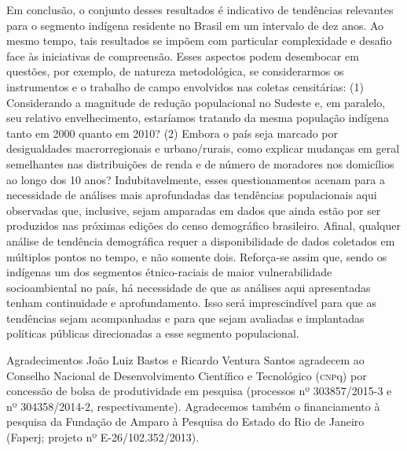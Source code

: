 \documentclass{article}
\begin{document}
Em conclusão, o conjunto desses resultados é indicativo de tendências relevantes
para o segmento indígena residente no Brasil em um intervalo de dez anos. Ao
mesmo tempo, tais resultados se impõem com particular complexidade e desafio
face às iniciativas de compreensão. Esses aspectos podem desembocar em questões,
por exemplo, de natureza metodológica, se considerarmos os instrumentos e o
trabalho de campo envolvidos nas coletas censitárias: (1) Considerando a
magnitude de redução populacional no Sudeste e, em paralelo, seu relativo
envelhecimento, estaríamos tratando da mesma população indígena tanto em 2000
quanto em 2010? (2) Embora o país seja marcado por desigualdades macrorregionais
e urbano/rurais, como explicar mudanças em geral semelhantes nas distribuições
de renda e de número de moradores nos domicílios ao longo dos 10 anos?
Indubitavelmente, esses questionamentos acenam para a necessidade de análises
mais aprofundadas das tendências populacionais aqui observadas que, inclusive,
sejam amparadas em dados que ainda estão por ser produzidos nas próximas edições
do censo demográfico brasileiro. Afinal, qualquer análise de tendência
demográfica requer a disponibilidade de dados coletados em múltiplos pontos no
tempo, e não somente dois. Reforça-se assim que, sendo os indígenas um dos
segmentos étnico-raciais de maior vulnerabilidade socioambiental no país, há
necessidade de que as análises aqui apresentadas tenham continuidade e
aprofundamento. Isso será imprescindível para que as tendências sejam
acompanhadas e para que sejam avaliadas e implantadas políticas públicas
direcionadas a esse segmento populacional.

Agradecimentos
João Luiz Bastos e Ricardo Ventura Santos agradecem ao Conselho Nacional de
Desenvolvimento Científico e Tecnológico (\textsc{cnp}q) por concessão de bolsa de
produtividade em pesquisa (processos nº 303857/2015-3 e nº 304358/2014-2,
respectivamente). Agradecemos também o financiamento à pesquisa da Fundação de
Amparo à Pesquisa do Estado do Rio de Janeiro (Faperj; projeto nº
E-26/102.352/2013).
\end{document}
